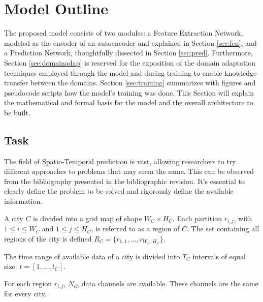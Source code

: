 

\section{Model Outline}

The proposed model consists of two modules: a Feature Extraction Network, modeled as the encoder of an autoencoder and explained in Section \ref{sec:fen}, and a Prediction Network, thoughtfully dissected in Section \ref{sec:pred}. Furthermore, Section \ref{sec:domainadap} is reserved for the exposition of the domain adaptation techniques employed through the model and during training to enable knowledge transfer between the domains. Section \ref{sec:training} summarizes with figures and pseudocode scripts how the model's training was done. This Section will explain the mathematical and formal basis for the model and the overall architecture to be built.



\subsection{Task}
The field of Spatio-Temporal prediction is vast, allowing researchers to try different approaches to problems that may seem the same. This can be observed from the bibliography presented in the bibliographic revision. It's essential to clearly define the problem to be solved and rigorously define the available information.

\begin{definition}\label{def:part}
A city $C$ is divided into a grid map of shape $W_{C}\times H_{C}$. Each partition $r_{i, j}$, with $1\leq i \leq W_C$ and $1\leq j \leq H_C$, is referred to as a region of $C$. The set containing all regions of the city is defined $R_C=\{r_{1, 1}, ..., r_{W_C, H_C}\}$.
\end{definition}

\begin{definition}\label{def:time}
The time range of available data of a city is divided into $T_{C}$  intervals of equal size: $t=[1, ..., t_{C}]$.
\end{definition}


\begin{definition}\label{def:ch}
For each region $r_{i, j}$, $N_{ch}$ data channels are available. These channels are the same for every city.
\end{definition}

